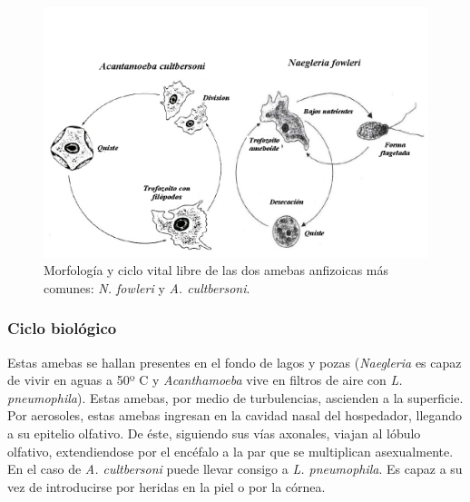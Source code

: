 \begin{figure}[H]
	\centering
	\includegraphics[trim=0 0.1cm 0.01cm 4cm,clip,width=0.55\columnwidth]{A.imagenes/ACV-BioSan-Parasit-AAnfizMorf}
	\caption[Morfología y ciclo vital \textit{N. fowleri} y \textit{A. cultbersoni}]{Morfología y ciclo vital libre de las dos amebas anfizoicas más comunes: \textit{N. fowleri} y \textit{A. cultbersoni}.\label{fig:PARASIT:AAnfizMorf}}
\end{figure}
\subsubsection{Ciclo biológico}
Estas amebas se hallan presentes en el fondo de lagos y pozas (\textit{Naegleria} es capaz de vivir en aguas a 50º C y \textit{Acanthamoeba} vive en filtros de aire con \textit{L. pneumophila}). Estas amebas, por medio de turbulencias, ascienden a la superficie. Por aerosoles, estas amebas ingresan en la cavidad nasal del hospedador, llegando a su epitelio olfativo. De éste, siguiendo sus vías axonales, viajan al lóbulo olfativo, extendiendose por el encéfalo a la par que se multiplican asexualmente. En el caso de \textit{A. cultbersoni} puede llevar consigo a \textit{L. pneumophila}. Es capaz a su vez de introducirse por heridas en la piel o por la córnea.
